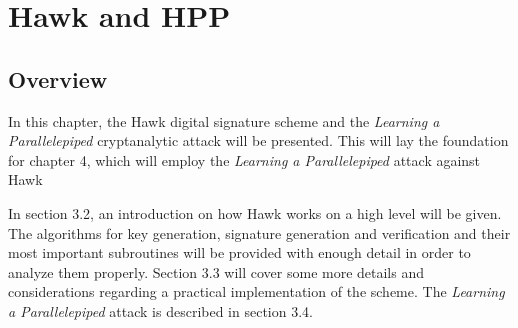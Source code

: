 \chapter{Hawk and HPP}
\section{Overview}
In this chapter, the Hawk digital signature scheme and the \textit{Learning a Parallelepiped} cryptanalytic attack will be presented.
This will lay the foundation for chapter 4, which will employ the \textit{Learning a Parallelepiped} attack against Hawk

In section 3.2, an introduction on how Hawk works on a high level will be given. The algorithms for key generation, signature 
generation and verification and their most important subroutines will be provided with enough detail in order to analyze them properly.
Section 3.3 will cover some more details and considerations regarding a practical implementation of the scheme.
The \textit{Learning a Parallelepiped} attack is described in section 3.4.
